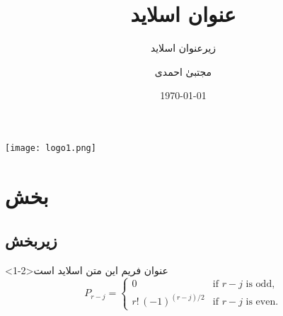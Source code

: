 \documentclass{beamer}
\title{عنوان اسلاید}
\subtitle{زیرعنوان اسلاید}
\author[مجتبیٰ احمدی]{{\color{blue}\nast مجتبیٰ احمدی}}
\institute[پیام‌نو‌ر مشگین شهر]{دانشگاه: پیام‌نو‌ر مشگین شهر}
\date{\today}
\begin{document}
\begin{frame}
\centerline{\texttt{[image: logo1.png]} }
\vskip-4mm
\titlepage
\end{frame}

\section{بخش}
\subsection{زیربخش}

\begin{frame}<1-2>{عنوان فریم}
این متن اسلاید است
\begin{equation}
P_{r-j}=\begin{cases}
0& \text{if $r-j$ is odd},\\
r!\,(-1)^{(r-j)/2}& \text{if $r-j$ is even}.
\end{cases}
\end{equation}

\end{frame}

\end{document}
